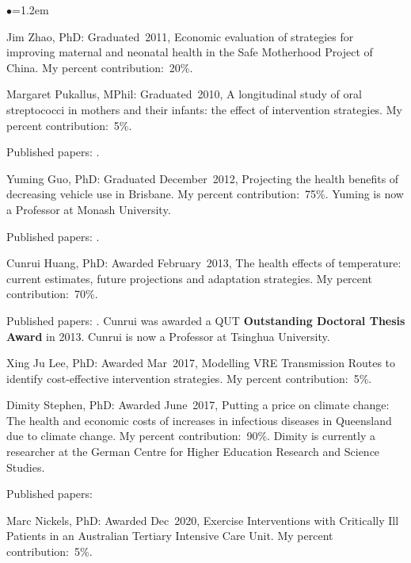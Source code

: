 \documentclass[a4paper,11pt]{article}
\renewcommand{\labelitemi}{$\bullet$}
\begin{document}
\begin{raggedright}
\begin{list}{\labelitemi}{\leftmargin=1.2em}
\item Jim Zhao, PhD: Graduated~2011, Economic evaluation of strategies for improving maternal and neonatal health in the Safe Motherhood Project of China. My percent contribution:~20\%.

\item Margaret Pukallus, MPhil: Graduated~2010, A longitudinal study of oral streptococci in mothers and their infants: the effect of intervention strategies. My percent contribution:~5\%.

Published papers: .

\item Yuming Guo, PhD: Graduated December~2012, Projecting the health benefits of decreasing vehicle use in Brisbane. My percent contribution:~75\%. Yuming is now a Professor at Monash University.

Published papers: . %

\item Cunrui Huang, PhD: Awarded February~2013, The health effects of temperature: current estimates, future projections and adaptation strategies. My percent contribution:~70\%.

Published papers: . Cunrui was awarded a QUT \textbf{Outstanding Doctoral Thesis Award} in 2013. Cunrui is now a Professor at Tsinghua University.

\item Xing Ju Lee, PhD: Awarded Mar~2017, Modelling VRE Transmission Routes to identify cost-effective intervention strategies. My percent contribution:~5\%.

\item Dimity Stephen, PhD: Awarded June~2017, Putting a price on climate change: The health and economic costs of increases in infectious diseases in Queensland due to climate change. My percent contribution:~90\%. Dimity is currently a researcher at the German Centre for Higher Education Research and Science Studies.

Published papers: 

\item Marc Nickels, PhD: Awarded Dec~2020, Exercise Interventions with Critically Ill Patients in an Australian Tertiary Intensive Care Unit. My percent contribution:~5\%.


\end{list}
\end{raggedright}
\end{document}
